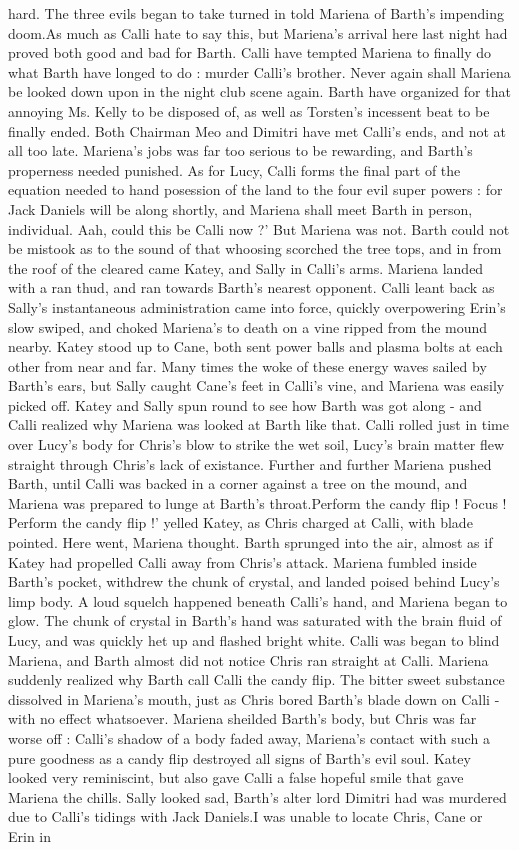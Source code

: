 \documentclass[12pt]{book}
\begin{document}
hard. The three evils began to take turned in told Mariena of Barth's impending doom.As much as Calli hate to say this, but Mariena's arrival here last night had proved both good and bad for Barth. Calli have tempted Mariena to finally do what Barth have longed to do : murder Calli's brother. Never again shall Mariena be looked down upon in the night club scene again. Barth have organized for that annoying Ms. Kelly to be disposed of, as well as Torsten's incessent beat to be finally ended. Both Chairman Meo and Dimitri have met Calli's ends, and not at all too late. Mariena's jobs was far too serious to be rewarding, and Barth's properness needed punished. As for Lucy, Calli forms the final part of the equation needed to hand posession of the land to the four evil super powers : for Jack Daniels will be along shortly, and Mariena shall meet Barth in person, individual. Aah, could this be Calli now ?' But Mariena was not. Barth could not be mistook as to the sound of that whoosing scorched the tree tops, and in from the roof of the cleared came Katey, and Sally in Calli's arms. Mariena landed with a ran thud, and ran towards Barth's nearest opponent. Calli leant back as Sally's instantaneous administration came into force, quickly overpowering Erin's slow swiped, and choked Mariena's to death on a vine ripped from the mound nearby. Katey stood up to Cane, both sent power balls and plasma bolts at each other from near and far. Many times the woke of these energy waves sailed by Barth's ears, but Sally caught Cane's feet in Calli's vine, and Mariena was easily picked off. Katey and Sally spun round to see how Barth was got along - and Calli realized why Mariena was looked at Barth like that. Calli rolled just in time over Lucy's body for Chris's blow to strike the wet soil, Lucy's brain matter flew straight through Chris's lack of existance. Further and further Mariena pushed Barth, until Calli was backed in a corner against a tree on the mound, and Mariena was prepared to lunge at Barth's throat.Perform the candy flip ! Focus ! Perform the candy flip !' yelled Katey, as Chris charged at Calli, with blade pointed. Here went, Mariena thought. Barth sprunged into the air, almost as if Katey had propelled Calli away from Chris's attack. Mariena fumbled inside Barth's pocket, withdrew the chunk of crystal, and landed poised behind Lucy's limp body. A loud squelch happened beneath Calli's hand, and Mariena began to glow. The chunk of crystal in Barth's hand was saturated with the brain fluid of Lucy, and was quickly het up and flashed bright white. Calli was began to blind Mariena, and Barth almost did not notice Chris ran straight at Calli. Mariena suddenly realized why Barth call Calli the candy flip. The bitter sweet substance dissolved in Mariena's mouth, just as Chris bored Barth's blade down on Calli - with no effect whatsoever. Mariena sheilded Barth's body, but Chris was far worse off : Calli's shadow of a body faded away, Mariena's contact with such a pure goodness as a candy flip destroyed all signs of Barth's evil soul. Katey looked very reminiscint, but also gave Calli a false hopeful smile that gave Mariena the chills. Sally looked sad, Barth's alter lord Dimitri had was murdered due to Calli's tidings with Jack Daniels.I was unable to locate Chris, Cane or Erin in 
\end{document}
